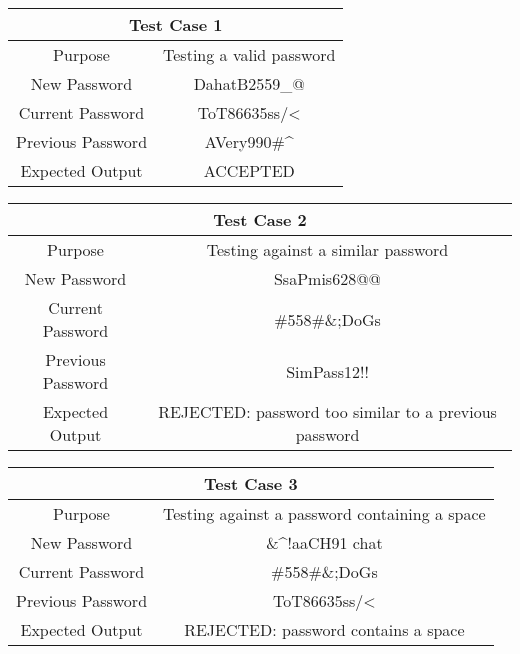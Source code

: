 \documentclass[12pt,letterpaper]{article}
\begin{document}
\begin{center}
  \begin{tabular}{||c|c||}
  \hline
  \multicolumn{2}{||c||}{Test Case 1} \\
  \hline
  Purpose & Testing a valid password \\
  \hline
  New Password & DahatB2559\_@ \\
  \hline
  Current Password & ToT86635ss/\textless \\
  \hline
  Previous Password & AVery990\#\^{} \\
  \hline
  Expected Output & ACCEPTED \\
  \hline
  \end{tabular}
\end{center}
\vspace{1mm}
\begin{center}
  \begin{tabular}{||c|c||}
  \hline
  \multicolumn{2}{||c||}{Test Case 2} \\
  \hline
  Purpose & Testing against a similar password \\
  \hline
  New Password & SsaPmis628@@ \\
  \hline
  Current Password & \#558\#\&;DoGs \\
  \hline
  Previous Password & SimPass12!! \\
  \hline
  Expected Output & REJECTED: password too similar to a previous password \\
  \hline
  \end{tabular}
\end{center}
\vspace{1mm}
\begin{center}
  \begin{tabular}{||c|c||}
  \hline
  \multicolumn{2}{||c||}{Test Case 3} \\
  \hline
  Purpose & Testing against a password containing a space\\
  \hline
  New Password & \&\^{}!aaCH91 chat \\
  \hline
  Current Password & \#558\#\&;DoGs \\
  \hline
  Previous Password & ToT86635ss/\textless \\
  \hline
  Expected Output & REJECTED: password contains a space \\
  \hline
  \end{tabular}
\end{center}
\vspace{1mm}
\end{document}
